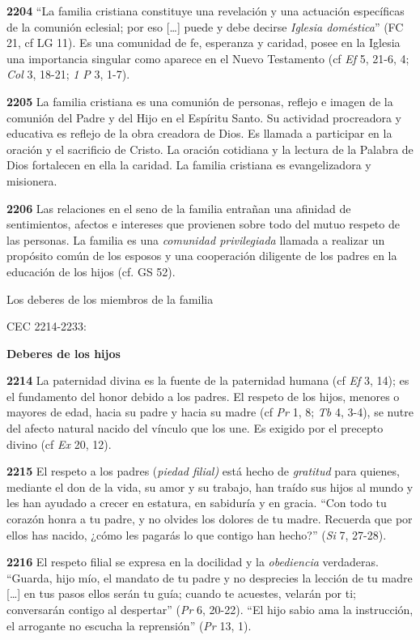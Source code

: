 \documentclass[]{article}
\begin{document}
\textbf{2204} ``La familia cristiana constituye una revelación y una
actuación específicas de la comunión eclesial; por eso [\ldots{}] puede y
debe decirse \emph{Iglesia doméstica}'' (FC 21, cf LG 11). Es una
comunidad de fe, esperanza y caridad, posee en la Iglesia una
importancia singular como aparece en el Nuevo Testamento (cf \emph{Ef}
5, 21-6, 4; \emph{Col} 3, 18-21; \emph{1 P} 3, 1-7).

\textbf{2205} La familia cristiana es una comunión de personas, reflejo
e imagen de la comunión del Padre y del Hijo en el Espíritu Santo. Su
actividad procreadora y educativa es reflejo de la obra creadora de
Dios. Es llamada a participar en la oración y el sacrificio de Cristo.
La oración cotidiana y la lectura de la Palabra de Dios fortalecen en
ella la caridad. La familia cristiana es evangelizadora y misionera.

\textbf{2206} Las relaciones en el seno de la familia entrañan una
afinidad de sentimientos, afectos e intereses que provienen sobre todo
del mutuo respeto de las personas. La familia es una \emph{comunidad
privilegiada} llamada a realizar un propósito común de los esposos y una
cooperación diligente de los padres en la educación de los hijos (cf. GS
52).

Los deberes de los miembros de la familia

CEC 2214-2233:

\textbf{Deberes de los hijos}

\textbf{2214} La paternidad divina es la fuente de la paternidad humana
(cf \emph{Ef} 3, 14); es el fundamento del honor debido a los padres. El
respeto de los hijos, menores o mayores de edad, hacia su padre y hacia
su madre (cf \emph{Pr} 1, 8; \emph{Tb} 4, 3-4), se nutre del afecto
natural nacido del vínculo que los une. Es exigido por el precepto
divino (cf \emph{Ex} 20, 12).

\textbf{2215} El respeto a los padres (\emph{piedad filial)} está hecho
de \emph{gratitud} para quienes, mediante el don de la vida, su amor y
su trabajo, han traído sus hijos al mundo y les han ayudado a crecer en
estatura, en sabiduría y en gracia. ``Con todo tu corazón honra a tu
padre, y no olvides los dolores de tu madre. Recuerda que por ellos has
nacido, ¿cómo les pagarás lo que contigo han hecho?'' (\emph{Si} 7,
27-28).

\textbf{2216} El respeto filial se expresa en la docilidad y la
\emph{obediencia} verdaderas. ``Guarda, hijo mío, el mandato de tu padre
y no desprecies la lección de tu madre [\ldots{}] en tus pasos ellos
serán tu guía; cuando te acuestes, velarán por ti; conversarán contigo
al despertar'' (\emph{Pr} 6, 20-22). ``El hijo sabio ama la instrucción,
el arrogante no escucha la reprensión'' (\emph{Pr} 13, 1).
\end{document}

